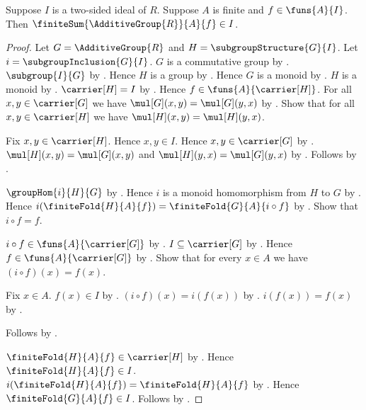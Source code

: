 \begin{theorem}\label{ideal_finite_sum}
    Suppose $I$ is a two-sided ideal of $R$.
    Suppose $A$ is finite and $f\in\funs{A}{I}$.
    Then $\finiteSum{\AdditiveGroup{R}}{A}{f}\in I$.
\end{theorem}
\begin{proof}
    Let $G=\AdditiveGroup{R}$ and
        $H=\subgroupStructure{G}{I}$.
    Let $i=\subgroupInclusion{G}{I}$.
    $G$ is a commutative group by
        .
    $\subgroup{I}{G}$ by
        .
    Hence $H$ is a group by .
    Hence $G$ is a monoid by
        .
    $H$ is a monoid by .
    $\carrier[H]=I$ by .
    Hence $f\in\funs{A}{\carrier[H]}$.
    For all $x,y\in\carrier[G]$ we have
        $\mul[G](x,y)=\mul[G](y,x)$ by
        .
    Show that for all $x,y\in\carrier[H]$ we have
        $\mul[H](x,y)=\mul[H](y,x)$.
    \begin{subproof}
        Fix $x,y\in\carrier[H]$.
        Hence $x,y\in I$.
        Hence $x,y\in\carrier[G]$ by
            .
        $\mul[H](x,y)=\mul[G](x,y)$ and
            $\mul[H](y,x)=\mul[G](y,x)$ by
            .
        Follows by .
    \end{subproof}
    $\groupHom{i}{H}{G}$ by
        .
    Hence $i$ is a monoid homomorphism from $H$ to $G$ by
        .
    Hence
        $i(\finiteFold{H}{A}{f})
            =\finiteFold{G}{A}{i\circ f}$ by
        .
    Show that $i\circ f=f$.
    \begin{subproof}
        $i\circ f\in\funs{A}{\carrier[G]}$ by
            .
        $I\subseteq\carrier[G]$ by .
        Hence $f\in\funs{A}{\carrier[G]}$ by
            .
        Show that for every $x\in A$ we have $(i\circ f)(x)=f(x)$.
        \begin{subproof}
            Fix $x\in A$.
            $f(x)\in I$ by .
            $(i\circ f)(x)=i(f(x))$ by
                .
            $i(f(x))=f(x)$ by
                .
        \end{subproof}
        Follows by .
    \end{subproof}
    $\finiteFold{H}{A}{f}\in\carrier[H]$ by
        .
    Hence $\finiteFold{H}{A}{f}\in I$.
    $i(\finiteFold{H}{A}{f})=\finiteFold{H}{A}{f}$ by
        .
    Hence $\finiteFold{G}{A}{f}\in I$.
    Follows by .
\end{proof}

